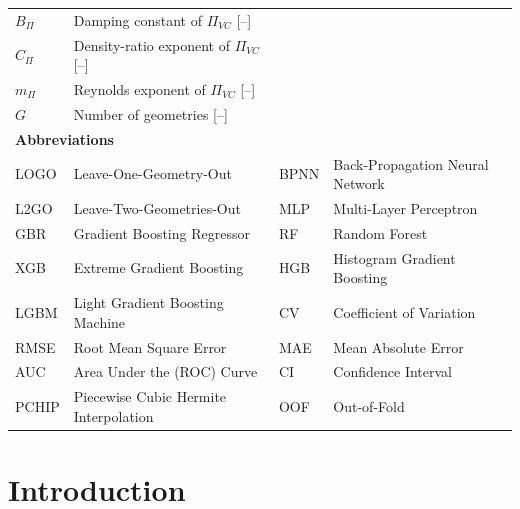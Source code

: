 \documentclass[12pt]{article}
\newcommand{\PiVC}{\Pi_{VC}}
\begin{document}
\begin{table}[!ht]
\begin{tabular}{llll}
$B_\Pi$ & Damping constant of $\PiVC$ [--] & & \\
$C_\Pi$ & Density-ratio exponent of $\PiVC$ [--] & & \\
$m_\Pi$ & Reynolds exponent of $\PiVC$ [--] & & \\
$G$ & Number of geometries [--] & & \\
\midrule
\multicolumn{4}{l}{\textbf{Abbreviations}} \\
\midrule
LOGO & Leave-One-Geometry-Out & BPNN & Back-Propagation Neural Network \\
L2GO & Leave-Two-Geometries-Out & MLP & Multi-Layer Perceptron \\
GBR & Gradient Boosting Regressor & RF & Random Forest \\
XGB & Extreme Gradient Boosting & HGB & Histogram Gradient Boosting \\
LGBM & Light Gradient Boosting Machine & CV & Coefficient of Variation \\
RMSE & Root Mean Square Error & MAE & Mean Absolute Error \\
AUC & Area Under the (ROC) Curve & CI & Confidence Interval \\
PCHIP & Piecewise Cubic Hermite Interpolation & OOF & Out-of-Fold \\
\bottomrule
\end{tabular}
\end{table}

\section{Introduction}
\end{document}
